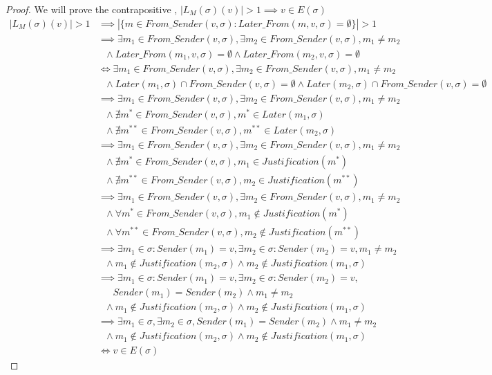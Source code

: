 \begin{proof}
We will prove the contrapositive , $|L_M(\sigma)(v)| > 1 \implies v \in E(\sigma)$
\begin{align*}
|L_M(\sigma)(v)| > 1 &\implies |\{m \in From\_Sender(v, \sigma) : Later\_From(m, v, \sigma) = \emptyset \}| > 1
\\
&\implies \exists m_1 \in From\_Sender(v, \sigma), \exists m_2 \in From\_Sender(v, \sigma), m_1 \neq m_2\\
&~~~\land Later\_From(m_1, v, \sigma) = \emptyset \land Later\_From(m_2,  v, \sigma) = \emptyset
\\
&\iff \exists m_1 \in From\_Sender(v, \sigma), \exists m_2 \in From\_Sender(v, \sigma), m_1 \neq m_2\\
&~~~\land Later(m_1, \sigma) \cap From\_Sender(v, \sigma) = \emptyset \land Later(m_2, \sigma) \cap From\_Sender(v, \sigma) = \emptyset
\\
&\implies \exists m_1 \in From\_Sender(v, \sigma), \exists m_2 \in From\_Sender(v, \sigma), m_1 \neq m_2\\
&~~~\land \nexists m^* \in From\_Sender(v, \sigma), m^* \in Later(m_1, \sigma) \\
&~~~\land \nexists m^{**} \in From\_Sender(v, \sigma), m^{**} \in Later(m_2, \sigma)
\\
&\implies \exists m_1 \in From\_Sender(v, \sigma), \exists m_2 \in From\_Sender(v, \sigma), m_1 \neq m_2\\
&~~~\land \nexists m^* \in From\_Sender(v, \sigma), m_1 \in Justification(m^*) \\
&~~~\land \nexists m^{**} \in From\_Sender(v, \sigma), m_2 \in Justification(m^{**})
\\
&\implies \exists m_1 \in From\_Sender(v, \sigma), \exists m_2 \in From\_Sender(v, \sigma), m_1 \neq m_2\\
&~~~\land \forall m^* \in From\_Sender(v, \sigma), m_1 \notin Justification(m^*) \\
&~~~\land \forall m^{**} \in From\_Sender(v, \sigma), m_2 \notin Justification(m^{**})
\\
&\implies \exists m_1 \in \sigma : Sender(m_1) = v, \exists m_2 \in \sigma : Sender(m_2) = v, m_1 \neq m_2\\
&~~~\land m_1 \notin Justification(m_2, \sigma) \land m_2 \notin Justification(m_1, \sigma)
\\
&\implies \exists m_1 \in \sigma : Sender(m_1) = v, \exists m_2 \in \sigma : Sender(m_2) = v, \\
&~~~~~~~Sender(m_1) = Sender(m_2) \land m_1 \neq m_2\\
&~~~\land m_1 \notin Justification(m_2, \sigma) \land m_2 \notin Justification(m_1, \sigma)
\\
&\implies \exists m_1 \in \sigma, \exists m_2 \in \sigma, Sender(m_1) = Sender(m_2) \land m_1 \neq m_2\\
&~~~\land m_1 \notin Justification(m_2, \sigma) \land m_2 \notin Justification(m_1, \sigma)
\\
&\iff v \in E(\sigma)
\end{align*}
\end{proof}


